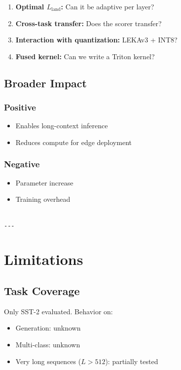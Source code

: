 \begin{enumerate}
\item \textbf{Optimal $L_\text{land}$:} Can it be adaptive per layer?
\item \textbf{Cross-task transfer:} Does the scorer transfer?
\item \textbf{Interaction with quantization:} LEKAv3 + INT8?
\item \textbf{Fused kernel:} Can we write a Triton kernel?

\end{enumerate}
\subsection{Broader Impact}

\subsubsection{Positive}
\begin{itemize}
\item Enables long-context inference
\item Reduces compute for edge deployment

\end{itemize}
\subsubsection{Negative}
\begin{itemize}
\item Parameter increase
\item Training overhead
\end{itemize}
\begin{lstlisting}

---
\end{lstlisting}

\section{Limitations}

\subsection{Task Coverage}

Only SST-2 evaluated. Behavior on:
\begin{itemize}
\item Generation: unknown
\item Multi-class: unknown
\item Very long sequences ($L > 512$): partially tested

\end{itemize}
